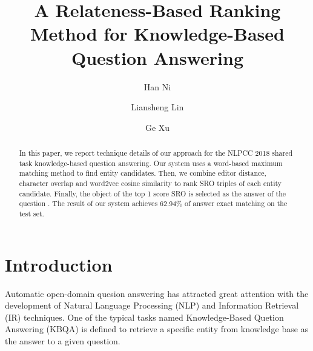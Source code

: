 \documentclass{llncs}
\begin{document}
%
%


%
%
\title{A Relateness-Based Ranking Method for Knowledge-Based Question Answering}
%
\titlerunning{}  %
%
\author{Han Ni \and Liansheng Lin \and Ge Xu}
%
%
%

\maketitle              %

\begin{abstract}
In this paper, we report technique details of our approach for the NLPCC 2018 
shared task knowledge-based question answering. Our system uses a word-based 
maximum matching method to find entity candidates. Then, we combine editor 
distance, character overlap and word2vec cosine similarity to rank SRO triples 
of each entity candidate. Finally, the object of the top 1 score SRO is 
selected as the answer of the question . The result of our system achieves 
62.94\% of answer exact matching on the test set.

\end{abstract}

\section{Introduction}
Automatic open-domain quesion answering has attracted great attention with the 
development of Natural Language Processing (NLP) and Information Retrieval (IR) 
techniques. One of the typical tasks named Knowledge-Based Quetion Answering 
(KBQA) is defined to retrieve a specific entity from knowledge base as the 
answer to a given question. 
\end{document}

